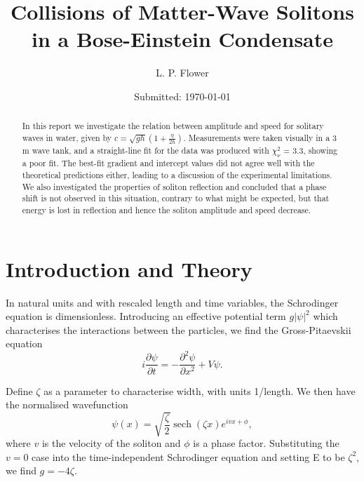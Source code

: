 \documentclass[10pt, twocolumn]{revtex4}    %
\DeclareMathOperator{\sech}{sech}		%
\begin{document}
                     


\title{Collisions of Matter-Wave Solitons in a Bose-Einstein Condensate} 
\date{Submitted: \today{}}
\author{L. P. Flower}

\begin{abstract}              
 
In this report we investigate the relation between amplitude and speed for solitary waves in water, given by $c = \sqrt{gh} \left(1 + \frac{\eta}{2h} \right)$. Measurements were taken visually in a 3 m wave tank, and a straight-line fit for the data was produced with $\chi_\nu^2$ = 3.3, showing a poor fit. The best-fit gradient and intercept values did not agree well with the theoretical predictions either, leading to a discussion of the experimental limitations. We also investigated the properties of soliton reflection and concluded that a phase shift is not observed in this situation, contrary to what might be expected, but that energy is lost in reflection and hence the soliton amplitude and speed decrease. 

\end{abstract}

\maketitle
\thispagestyle{plain} %



\section{Introduction and Theory} \label{Intro}

In natural units and with rescaled length and time variables, the Schrodinger equation is dimensionless. Introducing an effective potential term $g |\psi|^2$ which characterises the interactions between the particles, we find the Gross-Pitaevskii equation \cite{Gross} \cite{Pitaevskii}
\begin{equation}
i \frac{\partial \psi}{\partial t} = -\frac{\partial^2 \psi}{\partial x^2} + V \psi.
\end{equation}

Define $\zeta$ as a parameter to characterise width, with units 1/length. We then have the normalised wavefunction 
\begin{equation} 
\psi(x) = \sqrt{\frac{\zeta}{2}} \sech{(\zeta x)} e^{i v x + \phi},
\end{equation}
where $v$ is the velocity of the soliton and $\phi$ is a phase factor. 
Substituting the $v=0$ case into the time-independent Schrodinger equation and setting E to be $\zeta^2$, we find $g=-4\zeta$. 
\end{document}
